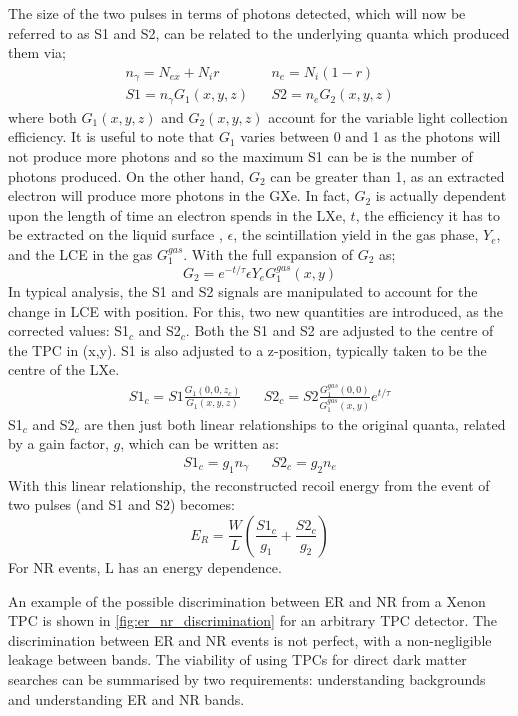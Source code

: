 \par
The size of the two pulses in terms of photons detected, which will now be referred to as S1 and S2, can be related to the underlying quanta which produced them via;
\begin{align}
    n_\gamma = N_{ex} + N_i r && n_e = N_i (1-r) \\
    S1 = n_\gamma G_1(x,y,z) && S2 = n_e G_2(x,y,z)
\end{align}
where both $G_1(x,y,z)$ and $G_2(x,y,z)$ account for the variable light collection efficiency.
It is useful to note that $G_1$ varies between 0 and 1 as the photons will not produce more photons and so the maximum S1 can be is the number of photons produced.
On the other hand, $G_2$ can be greater than 1, as an extracted electron will produce more photons in the GXe.
In fact, $G_2$ is actually dependent upon the length of time an electron spends in the LXe, $t$, the efficiency it has to be extracted on the liquid surface , $\epsilon$, the scintillation yield in the gas phase, $Y_e$, and the LCE in the gas $G_1^{gas}$.
With the full expansion of $G_2$ as;
\begin{equation}
    G_2 = e^{-t/\tau} \epsilon Y_e G_1^{gas}(x,y)
\end{equation}
In typical analysis, the S1 and S2 signals are manipulated to account for the change in LCE with position.
For this, two new quantities are introduced, as the corrected values: S1$_c$ and S2$_c$.
Both the S1 and S2 are adjusted to the centre of the TPC in (x,y).
S1 is also adjusted to a z-position, typically taken to be the centre of the LXe.
\begin{align}
    S1_c = S1 \frac{G_1(0,0,z_c)}{G_1(x,y,z)} && S2_c = S2 \frac{G_1^{gas}(0,0)}{G_1^{gas}(x,y)} e^{t/\tau}
    \label{eq:s1c_and_s2c_full}
\end{align}
S1$_c$ and S2$_c$ are then just both linear relationships to the original quanta, related by a gain factor, $g$, which can be written as:
\begin{align}
    S1_c = g_1 n_\gamma && S2_c = g_2 n_e
\end{align}
With this linear relationship, the reconstructed recoil energy from the event of two pulses (and S1 and S2) becomes:
\begin{equation}
    E_R = \frac{W}{L}(\frac{S1_c}{g_1} + \frac{S2_c}{g_2})
\end{equation}
For NR events, L has an energy dependence.
\par
An example of the possible discrimination between ER and NR from a Xenon TPC is shown in \autoref{fig:er_nr_discrimination} for an arbitrary TPC detector.
The discrimination between ER and NR events is not perfect, with a non-negligible leakage between bands.
The viability of using TPCs for direct dark matter searches can be summarised by two requirements: understanding backgrounds and understanding ER and NR bands.

